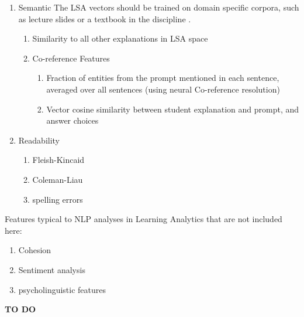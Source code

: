 \documentclass[sigconf]{acmart}
\begin{document}
\begin{enumerate}
\begin{enumerate}
		\item Semantic
		The LSA vectors should be trained on 
		domain specific corpora, such as 
		lecture slides or a textbook in the 
		discipline 
		\cite{mohler_text--text_2009}. 
		
		
		\begin{enumerate}
			\item Similarity to all other 
			explanations in LSA 
			space
			\item Co-reference Features 
			\cite{persing_end--end_2016} 
			\begin{enumerate}
				\item Fraction of entities from 
				the prompt mentioned in each 
				sentence, averaged over all 
				sentences (using neural 
				Co-reference 
				resolution)
				\item Vector cosine similarity 
				between student explanation and 
				prompt, and answer choices 
			\end{enumerate}
		\end{enumerate}
		
		
		\item Readability
		\begin{enumerate}
			\item Fleish-Kincaid
			\item Coleman-Liau
			\item spelling errors
		\end{enumerate}
	\end{enumerate}
\end{enumerate}

Features typical to NLP analyses in Learning 
Analytics that are not included 
here:
\begin{enumerate}
	\item Cohesion
	\item Sentiment analysis
	\item psycholinguistic features
\end{enumerate}


\begin{acks}
\textbf{TO DO}
\end{acks}



\end{document}
